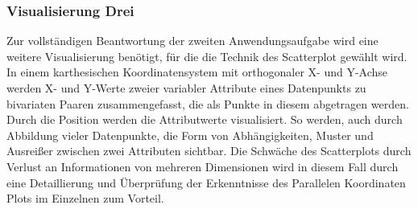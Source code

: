 \documentclass[usegeometry=true]{scrartcl}
\begin{document}




\subsubsection{Visualisierung Drei}
Zur vollständigen Beantwortung der zweiten Anwendungsaufgabe wird eine weitere Visualisierung benötigt, für die die Technik des Scatterplot gewählt wird.
In einem karthesischen Koordinatensystem mit orthogonaler X- und Y-Achse werden X- und Y-Werte zweier variabler Attribute eines Datenpunkts zu bivariaten Paaren zusammengefasst, die als Punkte in diesem abgetragen werden.
Durch die Position werden die Attributwerte visualisiert.\cite[103]{Friendly.2005}
So werden, auch durch Abbildung vieler Datenpunkte, die Form von Abhängigkeiten, Muster und Ausreißer zwischen zwei Attributen sichtbar.\cite[9]{Chan.2006} \cite[103]{Friendly.2005}
Die Schwäche des Scatterplots durch Verlust an Informationen von mehreren Dimensionen wird in diesem Fall durch eine Detaillierung und Überprüfung der Erkenntnisse des Parallelen Koordinaten Plots im Einzelnen zum Vorteil.\cite[9]{Chan.2006} \cite[93]{Wegman.1997}
\end{document}
